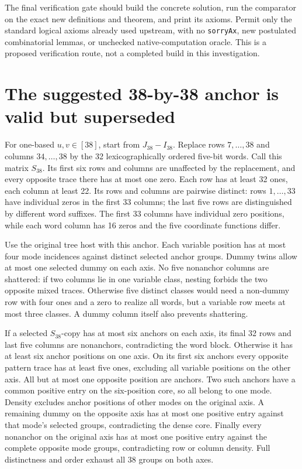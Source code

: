 \documentclass[11pt,a4paper]{article}
\theoremstyle{remark}
\begin{document}
The final verification gate should build the concrete solution,
run the comparator on the exact new definitions and theorem, and
print its axioms. Permit only the standard logical axioms already
used upstream, with no \texttt{sorryAx}, new postulated combinatorial
lemmas, or unchecked native-computation oracle. This is a proposed
verification route, not a completed build in this investigation.

\appendix
\section{The suggested 38-by-38 anchor is valid but superseded}
\label{app:38}
For one-based \(u,v\in[38]\), start from \(J_{38}-I_{38}\).
Replace rows \(7,\ldots,38\) and columns \(34,\ldots,38\)
by the 32 lexicographically ordered five-bit words. Call this
matrix \(S_{38}\). Its first six rows and columns are unaffected
by the replacement, and every opposite trace there has at most
one zero. Each row has at least 32 ones, each column at least
22. Its rows and columns are pairwise distinct: rows \(1,\ldots,33\)
have individual zeros in the first 33 columns; the last five rows
are distinguished by different word suffixes. The first 33 columns
have individual zero positions, while each word column has 16
zeros and the five coordinate functions differ.

Use the original tree host with this anchor. Each variable position
has at most four mode incidences against distinct selected anchor
groups. Dummy twins allow at most one selected dummy on each axis.
No five nonanchor columns are shattered: if two columns lie in one
variable class, nesting forbids the two opposite mixed traces.
Otherwise five distinct classes would need a non-dummy row with
four ones and a zero to realize all words, but a variable row meets
at most three classes. A dummy column itself also prevents shattering.

If a selected \(S_{38}\)-copy has at most six anchors on each axis,
its final 32 rows and last five columns are nonanchors, contradicting
the word block. Otherwise it has at least six anchor positions on
one axis. On its first six anchors every opposite pattern trace has
at least five ones, excluding all variable positions on the other
axis. All but at most one opposite position are anchors. Two such
anchors have a common positive entry on the six-position core, so
all belong to one mode. Density excludes anchor positions of other
modes on the original axis. A remaining dummy on the opposite axis
has at most one positive entry against that mode's selected groups,
contradicting the dense core. Finally every nonanchor on the original
axis has at most one positive entry against the complete opposite
mode groups, contradicting row or column density. Full distinctness
and order exhaust all 38 groups on both axes.
\end{document}
